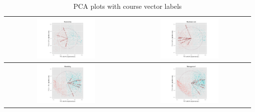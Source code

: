 \documentclass{sigchi}
\begin{document}
\begin{table}[h!]
 \begin{center}
   \begin{tabular}{| c | c |}

   \hline
   \includegraphics[width=0.5\textwidth]{figures/EconomicsPCA}
   &
   \includegraphics[width=0.5\textwidth]{figures/BusinessLawPCA}
   \\
   \hline
   \includegraphics[width=0.5\textwidth]{figures/MarketingPCA}
	&   
   \includegraphics[width=0.5\textwidth]{figures/ManagementPCA}
   \\
   \hline
   \end{tabular}
 \end{center}
 \caption{PCA plots with course vector labels}~\label{tab:pcaTable}
\end{table}
\end{document}
